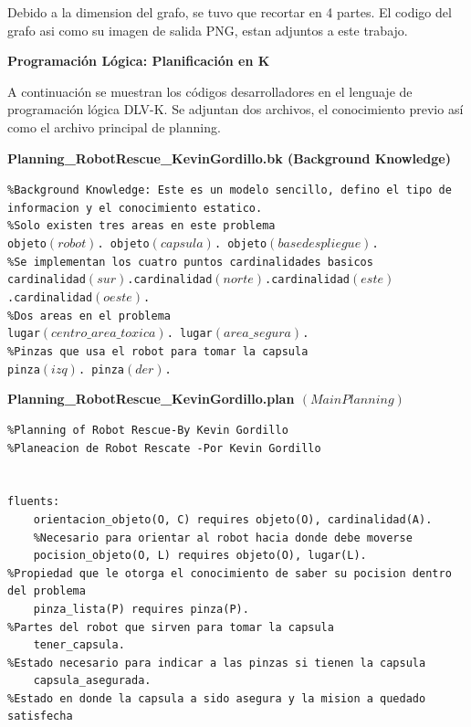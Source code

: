 \documentclass[letterpaper ,10pt]{article}
\begin{document}
{{\newpage
Debido a la dimension del grafo, se tuvo que recortar en 4 partes. El codigo del grafo asi como su imagen de salida PNG, estan adjuntos a este trabajo.
\vspace{2cm}
\\


\newpage
\centerline {\Huge\sffamily\textbf{Programación Lógica: Planificación en K }}
\vspace{0.5cm}
\noindent A continuación se muestran los códigos desarrolladores en el lenguaje de programación lógica DLV-K. Se adjuntan dos archivos, el conocimiento previo así como el archivo principal de planning.

\vspace{1cm}
{\centerline 
{ \large \textbf{ Planning\_RobotRescue\_KevinGordillo.bk (Background Knowledge)}
}

\noindent \small \texttt{\%Background Knowledge: Este es un modelo sencillo, defino el tipo de informacion y el conocimiento estatico.\\ 
\%Solo existen tres areas en este problema\\
objeto$(robot)$. objeto$(capsula)$. objeto$(basedespliegue)$.\\
\%Se implementan los cuatro puntos cardinalidades basicos\\
cardinalidad$(sur)$.cardinalidad$(norte)$.cardinalidad$(este)$.cardinalidad$(oeste)$.\\
\%Dos areas en el problema\\
lugar$(centro\_area\_toxica)$. lugar$(area\_segura)$.\\
\%Pinzas que usa el robot para tomar la capsula\\
pinza$(izq)$. pinza$(der)$.\\
 } 

\vspace{1cm}
{\centerline 
{ \large \textbf{Planning\_RobotRescue\_KevinGordillo.plan $(Main Planning)$}
}

{\noindent \tiny {
\begin{lstlisting}%Planning of Robot Rescue-By Kevin Gordillo
%Planeacion de Robot Rescate -Por Kevin Gordillo


fluents:
	orientacion_objeto(O, C) requires objeto(O), cardinalidad(A).
	%Necesario para orientar al robot hacia donde debe moverse
	pocision_objeto(O, L) requires objeto(O), lugar(L). 			
%Propiedad que le otorga el conocimiento de saber su pocision dentro del problema
	pinza_lista(P) requires pinza(P).								
%Partes del robot que sirven para tomar la capsula
	tener_capsula.													
%Estado necesario para indicar a las pinzas si tienen la capsula
	capsula_asegurada.												
%Estado en donde la capsula a sido asegura y la mision a quedado satisfecha	
	

\end{lstlisting}}}}}}}
\end{document}

